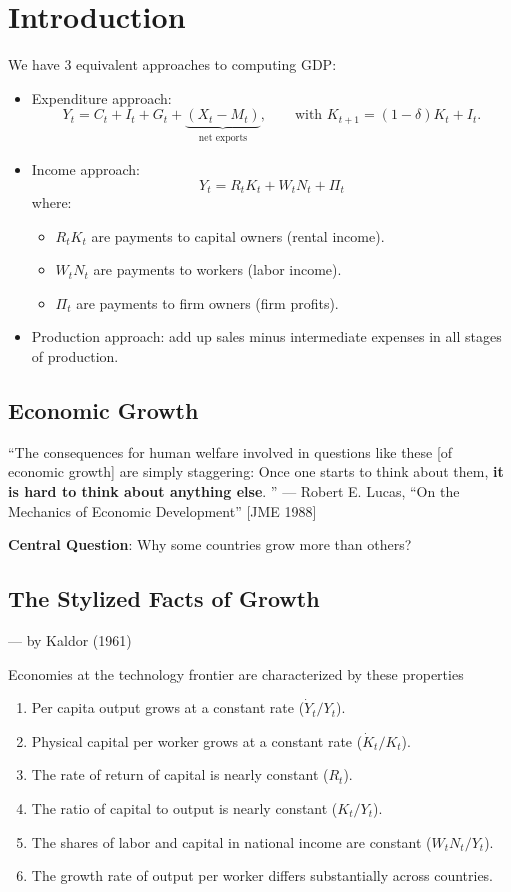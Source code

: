 \section{Introduction}

We have 3 equivalent approaches to computing GDP: \begin{itemize}
    \item Expenditure approach: \[
              Y_t = C_t + I_t + G_t + \underbrace{(X_t - M_t)}_{\substack{\text{net exports}}}, \qquad\text{with } K_{t+1} = (1-\delta)K_t + I_t.
          \]
    \item Income approach: \[
              Y_t = R_tK_t+W_tN_t+\Pi_t
          \]
          where: \begin{itemize}
              \item $R_tK_t$ are payments to capital owners (rental income).
              \item $W_tN_t$ are payments to workers (labor income).
              \item $\Pi_t$ are payments to firm owners (firm profits).
          \end{itemize}
    \item Production approach: add up sales minus intermediate expenses in all stages of production.
\end{itemize}

\subsection{Economic Growth}

``The consequences for human welfare involved in questions like these [of economic growth] are simply staggering: Once one starts to think about them, \textbf{it is hard to think about anything else}. '' --- Robert E. Lucas, “On the Mechanics of Economic Development” [JME 1988]

\textbf{Central Question}: Why some countries grow more than others?

\subsection{The Stylized Facts of Growth} --- by Kaldor (1961)

Economies at the technology frontier are characterized by these properties \begin{enumerate}
    \item Per capita output grows at a constant rate ($\dot{Y}_t/Y_t$).
    \item Physical capital per worker grows at a constant rate ($\dot{K}_t/K_t$).
    \item The rate of return of capital is nearly constant ($R_t$).
    \item The ratio of capital to output is nearly constant ($K_t/Y_t$).
    \item The shares of labor and capital in national income are constant ($W_tN_t/Y_t$).
    \item The growth rate of output per worker differs substantially across countries.
\end{enumerate}

